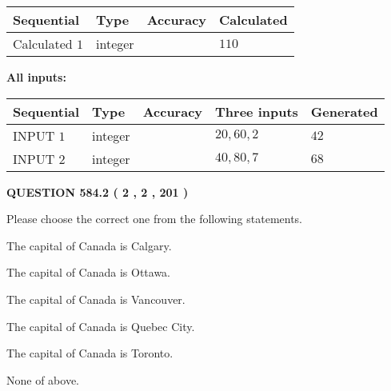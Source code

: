\documentclass[12pt]{article}
\begin{document}
   
   
   
\noindent{}
   
   
  
  
\noindent\begin{tabular}{|l|l|l|l|}
\hline
 Sequential & Type & Accuracy & Calculated \\ 
\hline
 
 
  Calculated $  1 $ & integer &  & 
  $ 110 $ 
 \\  \hline  
 \end{tabular}
   
   
   
   
\noindent\vspace{0.1in}\hspace{-0.08in} {\textbf{\Large{All inputs: }}}
   
   
  
  
\noindent\begin{tabular}{|l|l|l|l|l|}
\hline
 Sequential & Type & Accuracy & Three inputs & Generated \\ 
\hline
 
 
  INPUT $  1 $ & integer &  & $
 20
 , 
 60
 , 
 2
 $ & $ 42 $ 
 \\  \hline  
 
 
  INPUT $  2 $ & integer &  & $
 40
 , 
 80
 , 
 7
 $ & $ 68 $ 
 \\  \hline  
 \end{tabular}
   
   
  
\vspace{0.2in}
  
{\textbf{\Large{QUESTION
584.2 
 ( 2 , 2 , 201 )
}}}
  
  
Please choose the correct one from the following statements.
 
 
The capital of Canada is Calgary.
 
 
The capital of Canada is Ottawa.
 
 
The capital of Canada is Vancouver.
 
 
The capital of Canada is Quebec City.
 
 
The capital of Canada is Toronto.
 
 
 None of above.
 
 
\noindent{}
 
\end{document}
